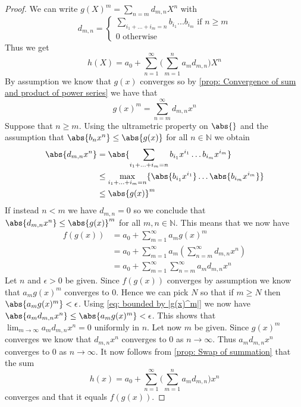 \documentclass{article}
\newcommand{\mbb}[1]{\mathbb{#1}}
\numberwithin{equation}{section}
\begin{document}
\begin{proof}
	We can write $g(X)^m = \sum_{n = m}d_{m,n} X^n$ with
	$$d_{m,n} = \begin{cases}
        	\sum_{i_1 + ... + i_m = n}b_{i_1}...b_{i_m} \text{ if } n \geq m \\
        	0 \text{ otherwise}
    	\end{cases}$$
	Thus we get
	$$h(X) = a_0 + \sum_{n = 1}^\infty\bigl(\sum_{m=1}^n a_m d_{m,n}  \bigr)X^n$$
	By assumption we know that $g(x)$ converges so by \cref{prop: Convergence of sum and product of power series} we have that
	$$g(x)^m = \sum_{n = m}^\infty d_{m,n}x^n$$
	Suppose that $n \geq m$. Using the ultrametric property on $\abs{}$ and the assumption that $\abs{b_nx^n} \leq \abs{g(x)}$ for all $n \in \mbb N$ we obtain
	\begin{equation}
    	\begin{aligned}
        	\abs{d_{m,n} x^n} & = \abs{\sum_{i_1 + \ldots + i_m = n} b_{i_1} x^{i_1} \ldots b_{i_m} x^{i_m}}          	\\
                          	& \leq \max_{i_1 + \ldots + i_m = n} \{\abs{b_{i_1} x^{i_1}} \ldots  \abs{b_{i_m} x^{i_m}}\} \\
                          	& \leq \abs{g(x)}^m
    	\end{aligned}
    	\label{eq: bounded by |g(x)^m|}
	\end{equation}
	If instead $n < m$ we have $d_{m,n} = 0$ so we conclude that $\abs{d_{m,n} x^n} \leq \abs {g(x)}^m$ for all $m,n \in \mbb N$. This means that we now have
	\begin{align*}
    	f(g(x)) & = a_0 + \sum_{m = 1}^\infty a_m g(x)^m                        	\\
            	& = a_0 + \sum_{m = 1}^\infty a_m (\sum_{n = m}^\infty d_{m,n} x^n) \\
            	& = a_0 + \sum_{m = 1}^\infty \sum_{n = m}^\infty a_m d_{m,n} x^n
	\end{align*}
	Let $n$ and $\epsilon > 0$ be given. Since $f(g(x))$ converges by assumption we know that $a_m g(x)^m$ converges to 0. Hence we can pick $N$ so that if $m \geq N$ then $\abs{a_m g(x)^m} < \epsilon$. Using \cref{eq: bounded by |g(x)^m|} we now have
	$\abs{a_m d_{m,n}x^n} \leq \abs{a_m g(x)^m} < \epsilon$. This shows that $\lim_{m \to \infty} a_m d_{m,n}x^n = 0 \text{ uniformly in } n$. Let now $m$ be given. Since $g(x)^m$ converges we know that $d_{m,n}x^n$ converges to 0 as $n \to \infty$. Thus $a_m d_{m,n}x^n$ converges to 0 as $n \to \infty$. It now follows from \cref{prop: Swap of summation} that the sum
	$$h(x) = a_0 + \sum_{n = 1}^\infty\bigl(\sum_{m=1}^n a_m d_{m,n}  \bigr)x^n$$
	converges and that it equals $f(g(x))$.
\end{proof}
\end{document}
